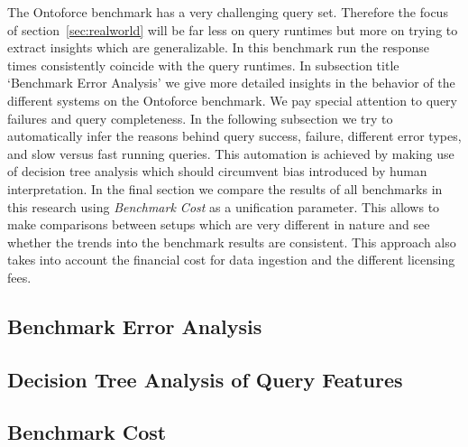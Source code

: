 The Ontoforce benchmark has a very challenging query set. Therefore the focus of section~\ref{sec:realworld} will be far less on query runtimes but more on trying to extract insights which are generalizable. In this benchmark run the response times consistently coincide with the query runtimes.  
In subsection title `Benchmark Error Analysis' %
we give more detailed insights in the behavior of the different systems on the Ontoforce benchmark. We pay special attention to query failures and query completeness.
In the following subsection
we try to automatically infer the reasons behind query success, failure, different error types, and slow versus fast running queries. This automation is achieved by making use of decision tree analysis which should circumvent bias introduced by human interpretation.
In the final section we compare the results of all benchmarks in this research using \emph{Benchmark Cost} as a unification parameter. This allows to make comparisons between setups which are very different in nature and see whether the trends into the benchmark results are consistent. This approach also takes into account the financial cost for data ingestion and the different licensing fees.

\subsection{Benchmark Error Analysis}
\label{subsec:erroranalysis}




\subsection{Decision Tree Analysis of Query Features}
\label{subsec:dtrees}




\subsection{Benchmark Cost}
\label{sec:bmcost}






